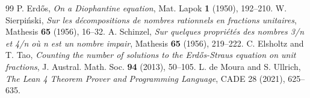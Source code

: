 \documentclass[11pt,a4paper]{article}
\theoremstyle{definition}
\begin{document}
\begin{thebibliography}{99}
 P. Erd\H{o}s, \textit{On a Diophantine equation}, Mat. Lapok \textbf{1} (1950), 192--210.
 W. Sierpi\'nski, \textit{Sur les d\'ecompositions de nombres rationnels en fractions unitaires}, Mathesis \textbf{65} (1956), 16--32.
 A. Schinzel, \textit{Sur quelques propri\'et\'es des nombres 3/n et 4/n o\`u n est un nombre impair}, Mathesis \textbf{65} (1956), 219--222.
 C. Elsholtz and T. Tao, \textit{Counting the number of solutions to the Erd\H{o}s-Straus equation on unit fractions}, J. Austral. Math. Soc. \textbf{94} (2013), 50--105.
 L. de Moura and S. Ullrich, \textit{The Lean 4 Theorem Prover and Programming Language}, CADE 28 (2021), 625--635.
\end{thebibliography}
\end{document}
